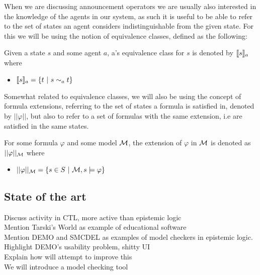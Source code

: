 When we are discussing announcement operators we are usually also interested in the knowledge of the agents in our system, as such it is useful to be able to refer to the set of states an agent considers indistinguishable from the given state. For this we will be using the notion of equivalence classes, defined as the following:

\begin{definition}
	\label{def:eqclass}
	Given a state $s$ and some agent $a$, a's equivalence class for $s$ is denoted by $\llbracket s\rrbracket_a$ where
	\begin{itemize}
		\item[] $\llbracket s\rrbracket_a = \{t~|~s\sim_a t\}$
	\end{itemize}
\end{definition}

Somewhat related to equivalence classes, we will also be using the concept of formula extensions, referring to the set of states a formula is satisfied in, denoted by $||\varphi||$, but also to refer to a set of formulas with the same extension, i.e are satisfied in the same states.

\begin{definition}
	\label{def:ext}
	For some formula $\varphi$ and some model $\mathcal{M}$, the extension of $\varphi$ in $\mathcal{M}$ is denoted as $||\varphi||_{\mathcal{M}}$ where 
	\begin{itemize}
		\item[] $||\varphi||_{\mathcal{M}} = \{s\in S ~|~\mathcal{M},s\models\varphi\}$
	\end{itemize}
\end{definition}


\subsection{State of the art}


Discuss activity in CTL, more active than epistemic logic\\
Mention Tarski's World as example of educational software\\
Mention DEMO and SMCDEL as examples of model checkers in epistemic logic.\\
Highlight DEMO's usability problem, shitty UI\\
Explain how \cname{} will attempt to improve this\\

We will introduce a model checking tool 
